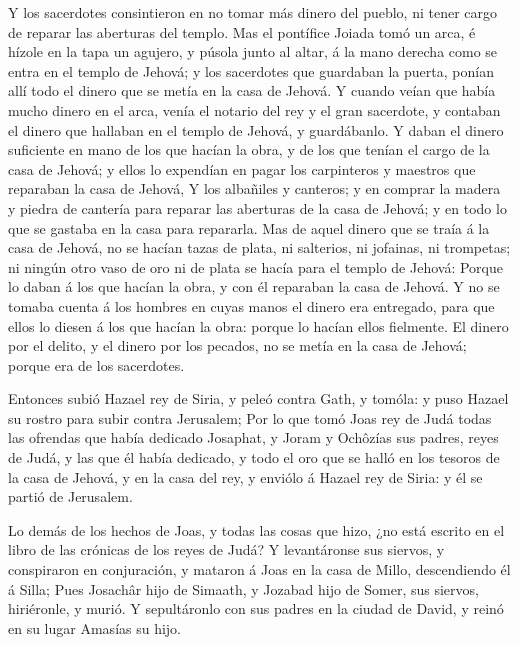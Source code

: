  Y los sacerdotes consintieron en no tomar más dinero del
pueblo, ni tener cargo de reparar las aberturas del templo. 
Mas el pontífice Joiada tomó un arca, é hízole en la tapa un agujero, y
púsola junto al altar, á la mano derecha como se entra en el templo de
Jehová; y los sacerdotes que guardaban la puerta, ponían allí todo el
dinero que se metía en la casa de Jehová.  Y cuando veían
que había mucho dinero en el arca, venía el notario del rey y el gran
sacerdote, y contaban el dinero que hallaban en el templo de Jehová, y
guardábanlo.  Y daban el dinero suficiente en mano de los
que hacían la obra, y de los que tenían el cargo de la casa de Jehová; y
ellos lo expendían en pagar los carpinteros y maestros que reparaban la
casa de Jehová,  Y los albañiles y canteros; y en comprar
la madera y piedra de cantería para reparar las aberturas de la casa de
Jehová; y en todo lo que se gastaba en la casa para repararla.
 Mas de aquel dinero que se traía á la casa de Jehová, no
se hacían tazas de plata, ni salterios, ni jofainas, ni trompetas; ni
ningún otro vaso de oro ni de plata se hacía para el templo de Jehová:
 Porque lo daban á los que hacían la obra, y con él
reparaban la casa de Jehová.  Y no se tomaba cuenta á los
hombres en cuyas manos el dinero era entregado, para que ellos lo diesen
á los que hacían la obra: porque lo hacían ellos fielmente.
 El dinero por el delito, y el dinero por los pecados, no
se metía en la casa de Jehová; porque era de los sacerdotes.

 Entonces subió Hazael rey de Siria, y peleó contra Gath, y
tomóla: y puso Hazael su rostro para subir contra Jerusalem;
 Por lo que tomó Joas rey de Judá todas las ofrendas que
había dedicado Josaphat, y Joram y Ochôzías sus padres, reyes de Judá, y
las que él había dedicado, y todo el oro que se halló en los tesoros de
la casa de Jehová, y en la casa del rey, y enviólo á Hazael rey de
Siria: y él se partió de Jerusalem.

 Lo demás de los hechos de Joas, y todas las cosas que
hizo, ¿no está escrito en el libro de las crónicas de los reyes de Judá?
 Y levantáronse sus siervos, y conspiraron en conjuración,
y mataron á Joas en la casa de Millo, descendiendo él á Silla;
 Pues Josachâr hijo de Simaath, y Jozabad hijo de Somer,
sus siervos, hiriéronle, y murió. Y sepultáronlo con sus padres en la
ciudad de David, y reinó en su lugar Amasías su hijo.

